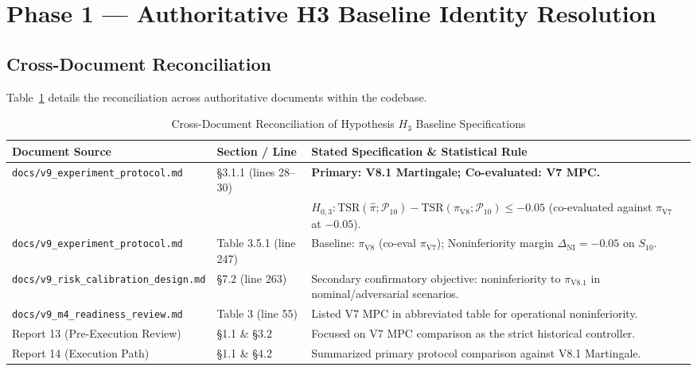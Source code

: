 \documentclass[10pt,a4paper]{article}
\begin{document}
\section{Phase 1 — Authoritative H3 Baseline Identity Resolution}

\subsection{Cross-Document Reconciliation}
Table~\ref{tab:h3_docs} details the reconciliation across authoritative documents within the codebase.

\begin{table}[htbp]
\centering
\small
\caption{Cross-Document Reconciliation of Hypothesis $H_3$ Baseline Specifications}
\label{tab:h3_docs}
\begin{tabularx}{\textwidth}{llX}
\toprule
\textbf{Document Source} & \textbf{Section / Line} & \textbf{Stated Specification \& Statistical Rule} \\
\midrule
\texttt{docs/v9\_experiment\_protocol.md} & \S3.1.1 (lines 28--30) & \textbf{Primary: V8.1 Martingale; Co-evaluated: V7 MPC.}\\
& & $H_{0,3}: \mathrm{TSR}(\hat{\pi};\mathcal{P}_{10}) - \mathrm{TSR}(\pi_{\mathrm{V8}};\mathcal{P}_{10}) \le -0.05$ (co-evaluated against $\pi_{\mathrm{V7}}$ at $-0.05$). \\
\midrule
\texttt{docs/v9\_experiment\_protocol.md} & Table 3.5.1 (line 247) & Baseline: $\pi_{\mathrm{V8}}$ (co-eval $\pi_{\mathrm{V7}}$); Noninferiority margin $\Delta_{\mathrm{NI}} = -0.05$ on $S_{10}$. \\
\midrule
\texttt{docs/v9\_risk\_calibration\_design.md} & \S7.2 (line 263) & Secondary confirmatory objective: noninferiority to $\pi_{\mathrm{V8.1}}$ in nominal/adversarial scenarios. \\
\midrule
\texttt{docs/v9\_m4\_readiness\_review.md} & Table 3 (line 55) & Listed V7 MPC in abbreviated table for operational noninferiority. \\
\midrule
Report 13 (Pre-Execution Review) & \S1.1 \& \S3.2 & Focused on V7 MPC comparison as the strict historical controller. \\
\midrule
Report 14 (Execution Path) & \S1.1 \& \S4.2 & Summarized primary protocol comparison against V8.1 Martingale. \\
\bottomrule
\end{tabularx}
\end{table}
\end{document}
